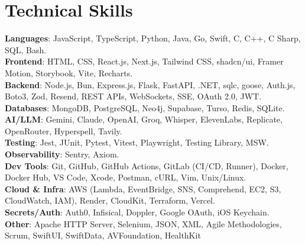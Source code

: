 \documentclass[letterpaper,11pt]{article}
\begin{document}
\section{Technical Skills}
\begin{itemize}[leftmargin=0.15in, label={}]
\small{\item{
\textbf{Languages}{: JavaScript, TypeScript, Python, Java, Go, Swift, C, C++, C Sharp, SQL, Bash.} \\
\textbf{Frontend}{: HTML, CSS, React.js, Next.js, Tailwind CSS, shadcn/ui, Framer Motion, Storybook, Vite, Recharts.} \\
\textbf{Backend}{: Node.js, Bun, Express.js, Flask, FastAPI, .NET, sqlc, goose, Auth.js, Boto3, Zod, Resend, REST APIs, WebSockets, SSE, OAuth 2.0, JWT.} \\
\textbf{Databases}{: MongoDB, PostgreSQL, Neo4j, Supabase, Turso, Redis, SQLite.} \\
\textbf{AI/LLM}{: Gemini, Claude, OpenAI, Groq, Whisper, ElevenLabs, Replicate, OpenRouter, Hyperspell, Tavily.} \\
\textbf{Testing}{: Jest, JUnit, Pytest, Vitest, Playwright, Testing Library, MSW.} \\
\textbf{Observability}{: Sentry, Axiom.} \\
\textbf{Dev Tools}{: Git, GitHub, GitHub Actions, GitLab (CI/CD, Runner), Docker, Docker Hub, VS Code, Xcode, Postman, cURL, Vim, Unix/Linux.} \\
\textbf{Cloud \& Infra}{: AWS (Lambda, EventBridge, SNS, Comprehend, EC2, S3, CloudWatch, IAM), Render, CloudKit, Terraform, Vercel.} \\
\textbf{Secrets/Auth}{: Auth0, Infisical, Doppler, Google OAuth, iOS Keychain.} \\
\textbf{Other}{: Apache HTTP Server, Selenium, JSON, XML, Agile Methodologies, Scrum, SwiftUI, SwiftData, AVFoundation, HealthKit}}}
\end{itemize}

\end{document}
